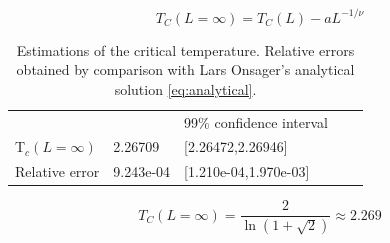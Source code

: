  \begin{equation}
   \label{eq:scaling}
   T_C(L=\infty) = T_C(L) - aL^{-1/\nu}
 \end{equation}




 \begin{table}[htp]
 \centering
 \begin{tabular}{|l|l|l|ll}
 \cline{1-3}
                &        & 99\% confidence interval  &  &  \\ \cline{1-3}
 T$_c(L=\infty)$          & 2.26709   & {[}2.26472,2.26946{]}     &  &  \\ \cline{1-3}
 Relative error & 9.243e-04 & {[}1.210e-04,1.970e-03{]} &  &  \\ \cline{1-3}
 \end{tabular}
 \caption{Estimations of the critical temperature. Relative errors obtained by
 comparison with Lars Onsager's analytical solution \cref{eq:analytical}.}
 \label{tab:results}
 \end{table}


\begin{equation}
  \label{eq:analytical}
  T_C(L=\infty) = \frac{2}{\ln(1 + \sqrt2)} \approx 2.269
\end{equation}






%
%
%
%
%
%
